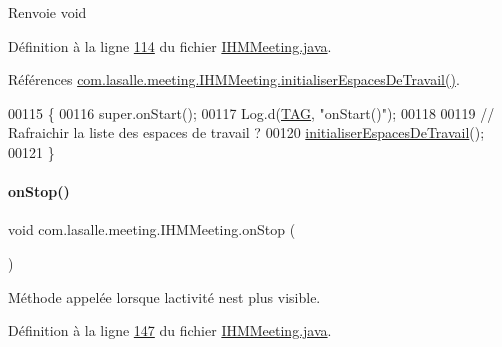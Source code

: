 \begin{DoxyReturn}{Renvoie}
void 
\end{DoxyReturn}


Définition à la ligne \hyperlink{_i_h_m_meeting_8java_source_l00114}{114} du fichier \hyperlink{_i_h_m_meeting_8java_source}{I\+H\+M\+Meeting.\+java}.



Références \hyperlink{_i_h_m_meeting_8java_source_l00171}{com.\+lasalle.\+meeting.\+I\+H\+M\+Meeting.\+initialiser\+Espaces\+De\+Travail()}.


\begin{DoxyCode}
00115     \{
00116         super.onStart();
00117         Log.d(\hyperlink{classcom_1_1lasalle_1_1meeting_1_1_i_h_m_meeting_a239eafcb0ccc896bdba538d1c0f08e65}{TAG}, \textcolor{stringliteral}{"onStart()"});
00118 
00119         \textcolor{comment}{// Rafraichir la liste des espaces de travail ?}
00120         \hyperlink{classcom_1_1lasalle_1_1meeting_1_1_i_h_m_meeting_ad4660f416b16b6df0f96d58f4c36b6f6}{initialiserEspacesDeTravail}();
00121     \}
\end{DoxyCode}
\mbox{\label{classcom_1_1lasalle_1_1meeting_1_1_i_h_m_meeting_a74e6b3e48ce9a26612916194d4692e6a}} 
\paragraph{\texorpdfstring{on\+Stop()}{onStop()}}
{\footnotesize\ttfamily void com.\+lasalle.\+meeting.\+I\+H\+M\+Meeting.\+on\+Stop (\begin{DoxyParamCaption}{ }\end{DoxyParamCaption})\hspace{0.3cm}{\ttfamily [protected]}}



Méthode appelée lorsque l\textquotesingle{}activité n\textquotesingle{}est plus visible. 



Définition à la ligne \hyperlink{_i_h_m_meeting_8java_source_l00147}{147} du fichier \hyperlink{_i_h_m_meeting_8java_source}{I\+H\+M\+Meeting.\+java}.


